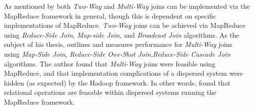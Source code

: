 As mentioned by \cite{chandar2010} both \textit{Two-Way} and \textit{Multi-Way} joins can be implemented via the MapReduce framework in general, though this is dependent on specific implementations of MapReduce. \textit{Two-Way} joins can be achieved via MapReduce using \textit{Reduce-Side Join}, \textit{Map-side Join}, and \textit{Broadcast Join} algorithms. As the subject of his thesis, \cite{chandar2010} outlines and measures performance for \textit{Multi-Way} joins using \textit{Map-Side Join}, \textit{Reduce-Side One-Shot Join},\textit{Reduce-Side Cascade Join} algorithms. The author found that \textit{Multi-Way} joins were feasible using MapReduce, and that implementation complications of a dispersed system were hidden (as expected) by the Hadoop framework. In other words, \cite{chandar2010} found that relational operations are feasable within dispersed systems running the MapReduce framework.